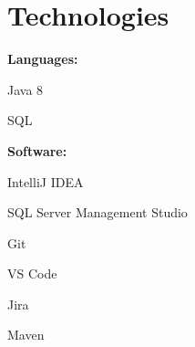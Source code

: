 \documentclass[letterpaper,11pt]{article}
\begin{document}
\section{Technologies}
\textbf{Languages:}
\hfill
\begin{itemize*}
	\item Java 8
	\item SQL
\end{itemize*}
\newline
\textbf{Software:}
\hfill
\begin{itemize*}
	\item IntelliJ IDEA
	\item SQL Server Management Studio
	\item Git
	\item VS Code
	\item Jira
	\item Maven
\end{itemize*}

\end{document}
